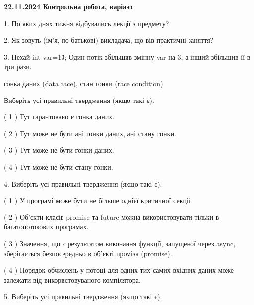 \documentclass[12pt, ukrainian]{article}
\begin{document}
\vspace{4mm}
\newpage
\begin {large}

\textbf{22.11.2024 Контрольна робота, варіант  }\par


{
1. По яких днях тижня відбувались лекції з предмету?



\vspace{5mm}
2. Як зовуть (ім'я, по батькові) викладача, що вів практичні заняття?



\vspace{5mm}
3. Нехай int var=13; Один потік збільшив змінну var на 3, а інший збільшив її в три рази.

гонка даних (data race), стан гонки (race condition)

Виберіть усі правильні твердження (якщо такі є).\par
\vspace{2mm}
( 1 ) Тут гарантовано є гонка даних.%

( 2 ) Тут може не бути ані гонки даних, ані стану гонки.%

( 3 ) Тут може не бути гонки даних.%

( 4 ) Тут може не бути стану гонки.%


\vspace{5mm}
4. Виберіть усі правильні твердження (якщо такі є).\par
\vspace{2mm}

( 1 ) У програмі може бути не більше однієї критичної секції.%

( 2 ) Об’єкти класів promise та future можна використовувати тільки в багатопотокових програмах.%

( 3 ) Значення, що є результатом виконання функції, запущеної через async, зберігається безпосередньо в об’єкті проміза (promise).%

( 4 ) Порядок обчислень у потоці для одних тих самих вхідних даних може залежати від використовуваного компілятора.%


\vspace{5mm}
5. Виберіть усі правильні твердження (якщо такі є).\par
\vspace{2mm}

}
\end{large}
\end{document}
